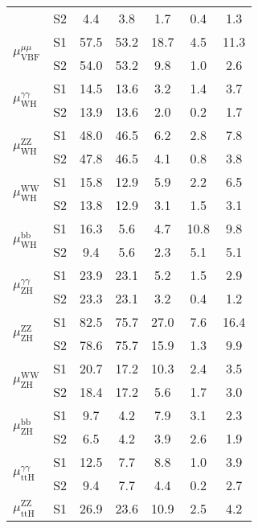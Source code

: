 \begin{tabular}{@{} l c c@{\hskip 0.15in} c c c c @{}}
                        & S2  & 4.4& 3.8 & 1.7 & 0.4 & 1.3  \\[4pt]
\multirow{2}{*}{$\mu_{\mathrm{VBF}}^{\mu \mu }$} & S1  & 57.5& 53.2 & 18.7 & 4.5 & 11.3  \\[1pt]
                        & S2  & 54.0& 53.2 & 9.8 & 1.0 & 2.6  \\[4pt]
\multirow{2}{*}{$\mu_{\mathrm{WH}}^{\gamma \gamma }$} & S1  & 14.5& 13.6 & 3.2 & 1.4 & 3.7  \\[1pt]
                        & S2  & 13.9& 13.6 & 2.0 & 0.2 & 1.7  \\[4pt]
\multirow{2}{*}{$\mu_{\mathrm{WH}}^{\mathrm{ZZ}}$} & S1  & 48.0& 46.5 & 6.2 & 2.8 & 7.8  \\[1pt]
                        & S2  & 47.8& 46.5 & 4.1 & 0.8 & 3.8  \\[4pt]
\multirow{2}{*}{$\mu_{\mathrm{WH}}^{\mathrm{WW}}$} & S1  & 15.8& 12.9 & 5.9 & 2.2 & 6.5  \\[1pt]
                        & S2  & 13.8& 12.9 & 3.1 & 1.5 & 3.1  \\[4pt]
\multirow{2}{*}{$\mu_{\mathrm{WH}}^{\mathrm{bb}}$} & S1  & 16.3& 5.6 & 4.7 & 10.8 & 9.8  \\[1pt]
                        & S2  & 9.4& 5.6 & 2.3 & 5.1 & 5.1  \\[4pt]
\multirow{2}{*}{$\mu_{\mathrm{ZH}}^{\gamma \gamma }$} & S1  & 23.9& 23.1 & 5.2 & 1.5 & 2.9  \\[1pt]
                        & S2  & 23.3& 23.1 & 3.2 & 0.4 & 1.2  \\[4pt]
\multirow{2}{*}{$\mu_{\mathrm{ZH}}^{\mathrm{ZZ}}$} & S1  & 82.5& 75.7 & 27.0 & 7.6 & 16.4  \\[1pt]
                        & S2  & 78.6& 75.7 & 15.9 & 1.3 & 9.9  \\[4pt]
\multirow{2}{*}{$\mu_{\mathrm{ZH}}^{\mathrm{WW}}$} & S1  & 20.7& 17.2 & 10.3 & 2.4 & 3.5  \\[1pt]
                        & S2  & 18.4& 17.2 & 5.6 & 1.7 & 3.0  \\[4pt]
\multirow{2}{*}{$\mu_{\mathrm{ZH}}^{\mathrm{bb}}$} & S1  & 9.7& 4.2 & 7.9 & 3.1 & 2.3  \\[1pt]
                        & S2  & 6.5& 4.2 & 3.9 & 2.6 & 1.9  \\[4pt]
\multirow{2}{*}{$\mu_{\mathrm{ttH}}^{\gamma \gamma }$} & S1  & 12.5& 7.7 & 8.8 & 1.0 & 3.9  \\[1pt]
                        & S2  & 9.4& 7.7 & 4.4 & 0.2 & 2.7  \\[4pt]
\multirow{2}{*}{$\mu_{\mathrm{ttH}}^{\mathrm{ZZ}}$} & S1  & 26.9& 23.6 & 10.9 & 2.5 & 4.2  \\[1pt]

\end{tabular}

